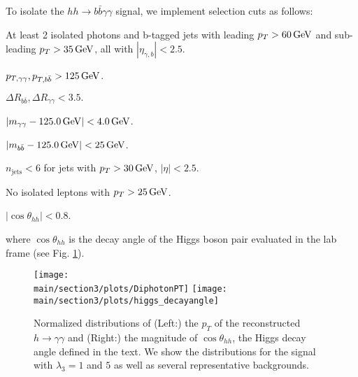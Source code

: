 
To isolate the $hh \rightarrow b\bar{b}\gamma\gamma$ signal, we implement selection cuts as follows:
\begin{itemize}
\setlength\itemsep{0.25em}
  \item At least 2 isolated photons and b-tagged jets with leading $p_T > 60\, {\rm GeV}$ and sub-leading $p_T > 35\, {\rm GeV}$, all with $|\eta_{\gamma,b}| < 2.5$.
  
\begin{minipage}{0.49\textwidth}
  \item $p_{T,\gamma\gamma}, p_{T,b\bar{b}} > 125\, {\rm GeV}$.
  \item $\Delta R_{b\bar{b}}, \Delta R_{\gamma\gamma} < 3.5.$
  \item $|m_{\gamma\gamma} - 125.0\, {\rm GeV}| < 4.0\, {\rm GeV}$.
  \item $|m_{b\bar{b}} - 125.0\, {\rm GeV}| < 25\, {\rm GeV}$.
\end{minipage}
\begin{minipage}{0.49\textwidth}
  \item $n_{\text{jets}} < 6$ for jets with $p_T > 30\, {\rm GeV}$, $|\eta| < 2.5$.
  \item No isolated leptons with $p_T > 25\, {\rm GeV}$.
  \item $|\cos\theta_{hh}| < 0.8$.
\end{minipage}
\end{itemize}

where $\cos\theta_{hh}$ is the decay angle of the Higgs boson pair evaluated in the lab frame (see Fig. \ref{fig:kinematics}).

\begin{figure}[ht]
\centering
	\texttt{[image: \\main/section3/plots/DiphotonPT]}%
\hfill
	\texttt{[image: \\main/section3/plots/higgs\_decayangle]}%
\caption{Normalized distributions of (Left:) the $p_T$ of the reconstructed $h\rightarrow\gamma\gamma$ and (Right:) the magnitude of $\cos\theta_{hh}$, the Higgs decay angle defined in the text. We show the distributions for the signal with $\lambda_{3} = 1$ and $5$ as well as several representative backgrounds.}
\label{fig:kinematics}
\end{figure}

